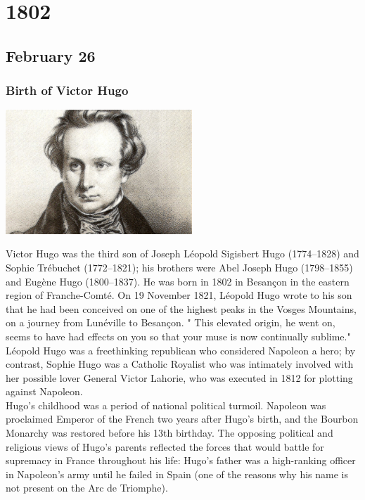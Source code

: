 \documentclass[11pt]{report}
\begin{document}
\chapter{1802}
\section{February 26}
\subsection{Birth of Victor Hugo}
\vspace{2mm}\begin{center}\includegraphics[width=7cm]{./img/youngHugo.jpg}\end{center}
Victor Hugo was the third son of Joseph Léopold Sigisbert Hugo (1774–1828) and Sophie Trébuchet (1772–1821); his brothers were Abel Joseph Hugo (1798–1855) and Eugène Hugo (1800–1837). He was born in 1802 in Besançon in the eastern region of Franche-Comté. On 19 November 1821, Léopold Hugo wrote to his son that he had been conceived on one of the highest peaks in the Vosges Mountains, on a journey from Lunéville to Besançon. " This elevated origin, he went on, seems to have had effects on you so that your muse is now continually sublime." Léopold Hugo was a freethinking republican who considered Napoleon a hero; by contrast, Sophie Hugo was a Catholic Royalist who was intimately involved with her possible lover General Victor Lahorie, who was executed in 1812 for plotting against Napoleon.\\
Hugo's childhood was a period of national political turmoil. Napoleon was proclaimed Emperor of the French two years after Hugo's birth, and the Bourbon Monarchy was restored before his 13th birthday. The opposing political and religious views of Hugo's parents reflected the forces that would battle for supremacy in France throughout his life: Hugo's father was a high-ranking officer in Napoleon's army until he failed in Spain (one of the reasons why his name is not present on the Arc de Triomphe).
\end{document}
